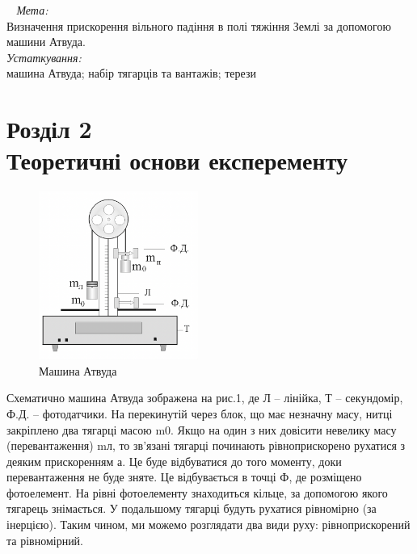 \documentclass[a4paper,12pt]{article}
\newcommand\tab[1][1cm]{\hspace*{#1}}
\begin{document}
$\>\>\>\>$\emph{Мета:}\\Визначення прискорення вільного падіння в полі тяжіння Землі за допомогою машини Атвуда.\\
\tab\emph{Устаткування:}\\машина Атвуда; набір тягарців та вантажів; терези
\newpage
\section*{Розділ 2\\Теоретичні основи експеременту}
\begin{figure}
\centering
\includegraphics[height=5.5cm]{atwood2.png}
\caption{Машина Атвуда}
\end{figure}
Схематично машина Атвуда зображена на рис.1, де Л – лінійка, Т – секундомір, Ф.Д. – фотодатчики.
На перекинутій через блок, що має незначну масу, нитці закріплено два тягарці масою m0. Якщо на один з них довісити невелику масу (перевантаження) mл, то зв’язані тягарці починають рівноприскорено рухатися з деяким прискоренням а. Це буде відбуватися до того моменту, доки перевантаження не буде зняте. Це відбувається в точці Ф, де розміщено фотоелемент. На рівні фотоелементу знаходиться кільце, за допомогою якого тягарець знімається. У подальшому тягарці будуть рухатися рівномірно (за інерцією). Таким чином, ми можемо розглядати два види руху: рівноприскорений та рівномірний.\\

\newpage
\end{document}
